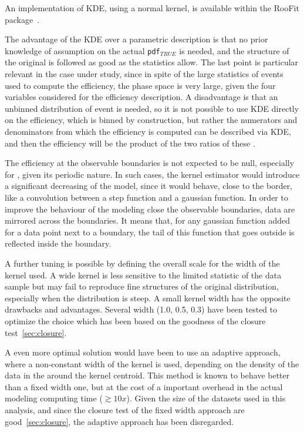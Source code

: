 An implementation of KDE, using a normal kernel, is available within the
{\sc RooFit} package~\cite{RooFit}. 

The advantage of the KDE over a parametric description is that no prior
knowledge of assumption on the actual \texttt{pdf}$_{TRUE}$ is needed, and the
structure of the original \pdf is followed as good as the statistics allow.
The last point is particular relevant in the case under study, since in spite
of the large statistics of events used to compute the efficiency, the phase
space is very large, given the four variables considered for the efficiency
description.
A disadvantage is that an unbinned distribution of event is needed, so it is
not possible to use KDE directly on the efficiency, which is binned by
construction, but rather the numerators and denominators from which the
efficiency is computed can be described via KDE, and then the efficiency will
be the product of the two ratios of these \pdf.

The efficiency at the observable boundaries is not expected to be null,
especially for \PHI, given its periodic nature. 
In such cases, the kernel estimator would introduce a significant decreasing of the model, since it would behave, close to the border, like a convolution between a step function and a gaussian function.
In order to improve the behaviour of the modeling close the observable
boundaries, data are mirrored across the boundaries. It means that, for any gaussian function added for a data point next to a boundary, the tail of this function that goes outside is reflected inside the boundary.

A further tuning is possible by defining the overall scale for the width of the
kernel used. A wide kernel is less sensitive to the limited statistic of the
data sample but may fail to reproduce fine structures of the original
distribution, especially when the distribution is steep. A small kernel width
has the opposite drawbacks and advantages. Several width (1.0, 0.5, 0.3) have
been tested to optimize the choice which has been based on the
goodness of the closure test~\ref{sec:closure}.

A even more optimal solution would have been to use an adaptive approach, where
a non-constant width of the kernel is used, depending on the density of the
data in the around the kernel centroid. This method is known to behave better
than a fixed width one, but at the cost of a important overhead in the actual
modeling computing time ($\gtrsim10x$).
Given the size of the datasets used in this analysis, and since the closure
test of the fixed width approach are good~\ref{sec:closure}, the adaptive
approach has been disregarded.

